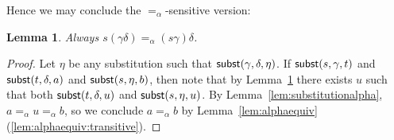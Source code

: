 \documentclass{lmcs}
\theoremstyle{theorem}\newtheorem{theorem}{Theorem}
\theoremstyle{theorem}\newtheorem{lemma}[theorem]{Lemma}
\theoremstyle{theorem}\newtheorem{corollary}[theorem]{Corollary}
\theoremstyle{definition}\newtheorem{definition}[theorem]{Definition}
\theoremstyle{definition}\newtheorem{example}[theorem]{Example}
\begin{document}
Hence we may conclude the $=_\alpha$-sensitive version:

\begin{lemma}\label{lem:combinesubst}
Always $s(\gamma\delta) =_\alpha (s\gamma)\delta$.
\end{lemma}

\begin{proof}
Let $\eta$ be any substitution such that $\mathsf{subst}(\gamma,\delta,\eta)$.
If $\mathsf{subst}(s,\gamma,t)$ and $\mathsf{subst}(t,\delta,a)$ and $\mathsf{subst}(s,\eta,b)$,
then note that by Lemma~\ref{lem:combinesubst} there exists $u$ such that both
$\mathsf{subst}(t,\delta,u)$ and $\mathsf{subst}(s,\eta,u)$.  By
Lemma~\ref{lem:substitutionalpha}, $a =_\alpha u =_\alpha b$, so we conclude
$a =_\alpha b$ by Lemma~\ref{lem:alphaequiv}(\ref{lem:alphaequiv:transitive}).
\end{proof}
\end{document}
